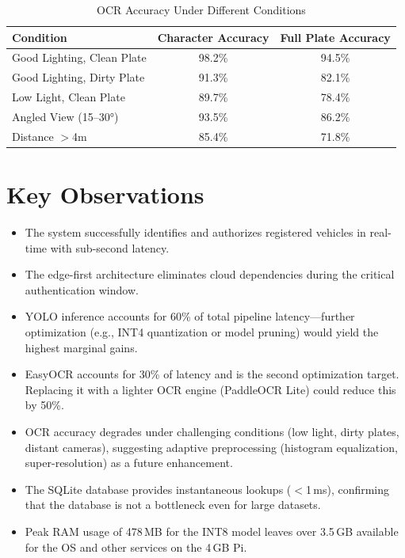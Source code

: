 \documentclass[11pt]{report}
\begin{document}
\begin{table}[H]
\centering
\caption{OCR Accuracy Under Different Conditions}
\renewcommand{\arraystretch}{1.3}
\begin{tabular}{|l|c|c|}
\hline
\textbf{Condition} & \textbf{Character Accuracy} & \textbf{Full Plate Accuracy} \\
\hline
Good Lighting, Clean Plate & 98.2\% & 94.5\% \\
\hline
Good Lighting, Dirty Plate & 91.3\% & 82.1\% \\
\hline
Low Light, Clean Plate & 89.7\% & 78.4\% \\
\hline
Angled View (15--30°) & 93.5\% & 86.2\% \\
\hline
Distance $>$4m & 85.4\% & 71.8\% \\
\hline
\end{tabular}
\end{table}

\section{Key Observations}
\begin{itemize}
    \item The system successfully identifies and authorizes registered vehicles in real-time with sub-second latency.
    \item The edge-first architecture eliminates cloud dependencies during the critical authentication window.
    \item YOLO inference accounts for 60\% of total pipeline latency---further optimization (e.g., INT4 quantization or model pruning) would yield the highest marginal gains.
    \item EasyOCR accounts for 30\% of latency and is the second optimization target. Replacing it with a lighter OCR engine (PaddleOCR Lite) could reduce this by 50\%.
    \item OCR accuracy degrades under challenging conditions (low light, dirty plates, distant cameras), suggesting adaptive preprocessing (histogram equalization, super-resolution) as a future enhancement.
    \item The SQLite database provides instantaneous lookups ($<$1\,ms), confirming that the database is not a bottleneck even for large datasets.
    \item Peak RAM usage of 478\,MB for the INT8 model leaves over 3.5\,GB available for the OS and other services on the 4\,GB Pi.
\end{itemize}
\end{document}
